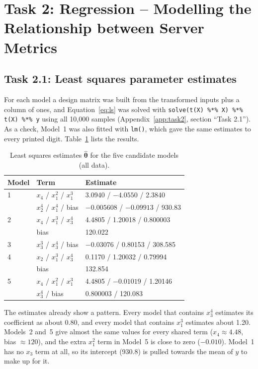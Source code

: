 \section{Task 2: Regression -- Modelling the Relationship between Server Metrics}
\label{sec:task2}

\subsection{Task 2.1: Least squares parameter estimates}
For each model a design matrix was built from the transformed inputs plus a column of ones, and Equation~\eqref{eq:ls} was solved with \texttt{solve(t(X) \%*\% X) \%*\% t(X) \%*\% y} using all 10{,}000 samples (Appendix~\ref{app:task2}, section ``Task 2.1''). As a check, Model~1 was also fitted with \texttt{lm()}, which gave the same estimates to every printed digit. Table~\ref{tab:theta} lists the results.

\begin{table}[H]
\centering
\caption{Least squares estimates $\hat{\boldsymbol\theta}$ for the five candidate models (all data).}
\label{tab:theta}
\begin{tabular}{lll}
\toprule
Model & Term & Estimate \\
\midrule
1 & $x_4$ / $x_1^2$ / $x_1^3$ & 3.0940 / $-4.0550$ / 2.3840 \\
  & $x_2^4$ / $x_1^4$ / bias & $-0.005608$ / $-0.09913$ / 930.83 \\
\midrule
2 & $x_4$ / $x_1^3$ / $x_3^4$ & 4.4805 / 1.20018 / 0.800003 \\
  & bias & 120.022 \\
\midrule
3 & $x_3^3$ / $x_3^4$ / bias & $-0.03076$ / 0.80153 / 308.585 \\
\midrule
4 & $x_2$ / $x_1^3$ / $x_3^4$ & 0.1170 / 1.20032 / 0.79994 \\
  & bias & 132.854 \\
\midrule
5 & $x_4$ / $x_1^2$ / $x_1^3$ & 4.4805 / $-0.01019$ / 1.20146 \\
  & $x_3^4$ / bias & 0.800003 / 120.083 \\
\bottomrule
\end{tabular}
\end{table}

The estimates already show a pattern. Every model that contains $x_3^4$ estimates its coefficient as about 0.80, and every model that contains $x_1^3$ estimates about 1.20. Models~2 and~5 give almost the same values for every shared term ($x_4\approx4.48$, bias $\approx120$), and the extra $x_1^2$ term in Model~5 is close to zero ($-0.010$). Model~1 has no $x_3$ term at all, so its intercept (930.8) is pulled towards the mean of $y$ to make up for it.

